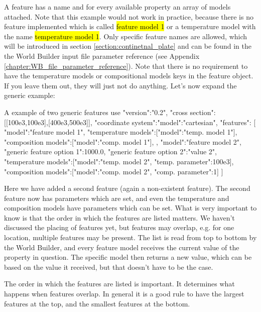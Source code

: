 \documentclass{book}
\newcommand{\WB}{{World Builder}}
\begin{document}
A feature has a name and for every available property an array of models attached. Note that this example would not work in practice, because there is no feature implemented which is called \hl{feature model 1} or a temperature model with the name \hl{temperature model 1}. Only specific feature names are allowed, which will be introduced in section \ref{section:continetnal_plate} and can be found in the the \WB{} input file parameter reference (see Appendix \ref{chapter:WB_file_parameter_reference}). Note that there is no requirement to have the temperature models or compositional models keys in the feature object. If you leave them out, they will just not do anything. Let's now expand the generic example:

\begin{javascriptcode}{A example of two generic features use}{}
{
  "version":"0.2",
  "cross section":[[100e3,100e3],[400e3,500e3]],
  "coordinate system":{"model":"cartesian"},
  "features":
  [
    {
      "model":"feature model 1",
      "temperature models":[{"model":"temp. model 1"}],
      "composition models":[{"model":"comp. model 1"}],
    },
    {
      "model":"feature model 2",
      "generic feature option 1":1000.0,
      "generic feature option 2":"value 2",
      "temperature models":[{"model":"temp. model 2", "temp. parameter":100e3}],
      "composition models":[{"model":"comp. model 2", "comp. parameter":1}]
    }
  ]
}
\end{javascriptcode}

Here we have added a second feature (again a non-existent feature). The second feature now has parameters which are set, and even the temperature and composition models have parameters which can be set. What is very important to know is that the order in which the features are listed matters. We haven't discussed the placing of features yet, but features may overlap, e.g. for one location, multiple features may be present. The list is read from top to bottom by the \WB{}, and every feature model receives the current value of the property in question. The specific model then returns a new value, which can be based on the value it received, but that doesn't have to be the case. 

\begin{remark}
The order in which the features are listed is important. It determines what happens when features overlap. In general it is a good rule to have the largest features at the top, and the smallest features at the bottom.
\end{remark}
\end{document}
